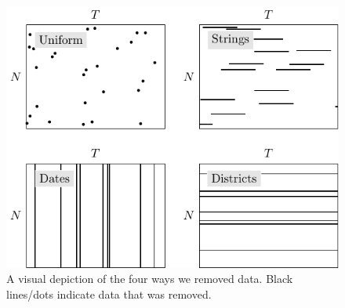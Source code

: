 \begin{figure}[t]
    \begin{center}
        \includegraphics[width=0.6\linewidth]{Figures/missing.pdf}
    \end{center}
    \caption{\small{A visual depiction of the four ways we removed data. Black lines/dots indicate data that was removed. }}
    \label{fig:missing_data}
\end{figure}





